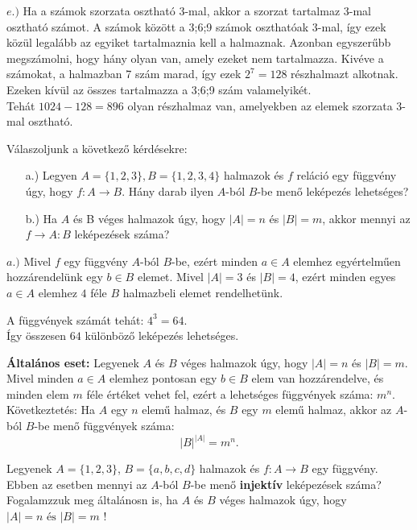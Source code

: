 \begin{solution}
	$e.)$ Ha a számok szorzata osztható 3-mal, akkor a szorzat tartalmaz
	3-mal osztható számot. A számok között a 3;6;9 számok oszthatóak 3-mal,
	így ezek közül legalább az egyiket tartalmaznia kell a halmaznak.
	Azonban egyszerűbb megszámolni, hogy hány olyan van, amely ezeket
	nem tartalmazza. Kivéve a számokat, a halmazban 7 szám marad, így
	ezek $2^{7}=128$ részhalmazt alkotnak. Ezeken kívül az összes tartalmazza
	a 3;6;9 szám valamelyikét. \\
	Tehát $1024-128=896$ olyan részhalmaz van, amelyekben az elemek szorzata
	3-mal osztható. 
\end{solution}
\begin{problem}
	Válaszoljunk a következő kérdésekre:
	\begin{enumerate}
		\item[a.)] Legyen $A=\{1,2,3\},B=\{1,2,3,4\}$ halmazok és $f$ reláció egy
		függvény úgy, hogy $f:A\rightarrow B$. Hány darab ilyen $A$-ból
		$B$-be menő leképezés lehetséges? 
		\item[b.)] Ha $A$ és B véges halmazok úgy, hogy $|A|=n$ és $|B|=m$, akkor
		mennyi az $f\rightarrow A:B$ leképezések száma? 
	\end{enumerate}
\end{problem}
\begin{solution}
	$a.)$ Mivel $f$ egy függvény $A$-ból $B$-be, ezért minden $a\in A$
	elemhez egyértelműen hozzárendelünk egy $b\in B$ elemet. Mivel $|A|=3$
	és $|B|=4$, ezért minden egyes $a\in A$ elemhez $4$ féle $B$ halmazbeli
	elemet rendelhetünk.
	
	A függvények számát tehát: $4^{3}=64.$ \\
	Így összesen $64$ különböző leképezés lehetséges.
	
	\textbf{Általános eset:} Legyenek $A$ és $B$ véges halmazok úgy,
	hogy $|A|=n$ és $|B|=m$. Mivel minden $a\in A$ elemhez pontosan
	egy $b\in B$ elem van hozzárendelve, és minden elem $m$ féle értéket
	vehet fel, ezért a lehetséges függvények száma: $m^{n}.$ \\
	Következtetés: Ha $A$ egy $n$ elemű halmaz, és $B$ egy $m$ elemű
	halmaz, akkor az $A$-ból $B$-be menő függvények száma: 
	\[
	|B|^{|A|}=m^{n}.
	\]
\end{solution}
\begin{problem}
	Legyenek $A=\{1,2,3\}$, $B=\{a,b,c,d\}$ halmazok és $f:A\rightarrow B$
	egy függvény. Ebben az esetben mennyi az $A$-ból $B$-be menő \textbf{injektív}
	leképezések száma? Fogalamzzuk meg általánosn is, ha $A$ és $B$
	véges halmazok úgy, hogy $|A|=n\text{ és }|B|=m$ ! 
\end{problem}
